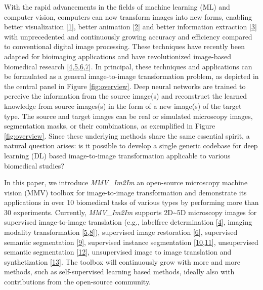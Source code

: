 With the rapid advancements in the fields of machine learning (ML) and computer vision, computers can now transform images into new forms, enabling better visualization {[}\protect\hyperlink{ref-1O0bopKD}{1}{]}, better animation {[}\protect\hyperlink{ref-LxlUp436}{2}{]} and better information extraction {[}\protect\hyperlink{ref-11chATuF4}{3}{]} with unprecedented and continuously growing accuracy and efficiency compared to conventional digital image processing.
These techniques have recently been adapted for bioimaging applications and have revolutionized image-based biomedical research {[}\protect\hyperlink{ref-Yq8wZ6hc}{4},\protect\hyperlink{ref-WwenuBHa}{5},\protect\hyperlink{ref-wcCVn8av}{6},\protect\hyperlink{ref-xPgDok51}{7}{]}. In principal, these techniques and applications can be formulated as a general image-to-image transformation problem, as depicted in the central panel in Figure \ref{fig:overview}. Deep neural networks are trained to perceive the information from the source image(s) and reconstruct the learned knowledge from source images(s) in the form of a new image(s) of the target type.
The source and target images can be real or simulated microscopy images, segmentation masks, or their combinations, as exemplified in Figure \ref{fig:overview}.
Since these underlying methods share the same essential spirit, a natural question arises: is it possible to develop a single generic codebase for deep learning (DL) based image-to-image transformation applicable to various biomedical studies?

In this paper, we introduce \emph{MMV\_Im2Im} an open-source microscopy machine vision (MMV) toolbox for image-to-image transformation and demonstrate its applications in over 10 biomedical tasks of various types by performing more than 30 experiments.
Currently, \emph{MMV\_Im2Im} supports 2D\textasciitilde5D microscopy images for supervised image-to-image translation (e.g., labelfree determination {[}\protect\hyperlink{ref-Yq8wZ6hc}{4}{]}, imaging modality transformation {[}\protect\hyperlink{ref-WwenuBHa}{5},\protect\hyperlink{ref-UEBDZ3tI}{8}{]}), supervised image restoration {[}\protect\hyperlink{ref-wcCVn8av}{6}{]}, supervised semantic segmentation {[}\protect\hyperlink{ref-TutLhFSz}{9}{]}, supervised instance segmentation {[}\protect\hyperlink{ref-K2ugNcVa}{10},\protect\hyperlink{ref-QmYuUQ5K}{11}{]}, unsupervised semantic segmentation {[}\protect\hyperlink{ref-RuFP3CS3}{12}{]}, unsupervised image to image translation and synthetization {[}\protect\hyperlink{ref-6wtIu4QY}{13}{]}. The toolbox will continuously grow with more and more methods, such as self-supervised learning based methods, ideally also with contributions from the open-source community.

